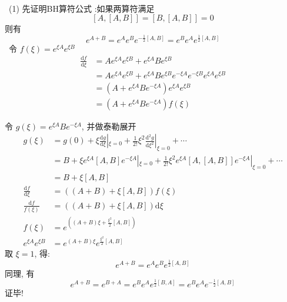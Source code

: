 \begin{frame}[allowframebreaks=] 
    \frametitle{}      
    ~\\
    \例 [3. 试证明平移符可写成 ]{ \[ D(\alpha)=\exp \left(\alpha a^{\dagger}-\alpha^{*} a\right) \]}
    \解 ~(1) 先证明BH算符公式 :如果两算符满足
        \[[A,[A,B]] = [B, [A,B]]=0\]
        则有 
        \[e^{A+B}= e^A e^B e^{-\frac{1}{2}[A,B]} =  e^B e^A e^{\frac{1}{2}[A,B]}\]  
    \证~令 $ f(\xi) = e^{\xi A} e^{\xi B}$ 
       \[ \begin{aligned}
           \frac{\mathrm{d}f}{\mathrm{d}\xi} &=Ae^{\xi A} e^{\xi B} + e^{\xi A} Be^{\xi B} \\
           &= Ae^{\xi A} e^{\xi B} + e^{\xi A} Be^{\xi B} e^{-\xi A} e^{-\xi B} e^{\xi A} e^{\xi B} \\
           &= (A+e^{\xi A} Be^{-\xi A})e^{\xi A} e^{\xi B} \\ 
           &= (A+e^{\xi A} Be^{-\xi A}) f(\xi)
       \end{aligned}\] 
             
       令 $g(\xi)= e^{\xi A} Be^{-\xi A}$, 并做泰勒展开
       \[\begin{aligned}
               g(\xi) &= g(0)+ \xi \frac{\mathrm{d}g}{\mathrm{d}\xi}|_{\xi=0}+ \frac{1}{2!}\xi^2 \frac{\mathrm{d}^2g}{\mathrm{d}\xi^2}|_{\xi=0}+ \cdots \\ 
               &= B + \xi e^{\xi A}[A,B]e^{-\xi A}|_{\xi=0} + \frac{1}{2!}\xi^2 e^{\xi A}[A,[A,B]]e^{-\xi A}|_{\xi=0} + \cdots \\ 
               &= B + \xi[A,B] \\ 
           \frac{\mathrm{d}f}{\mathrm{d}\xi} &= ((A+ B) + \xi[A,B] )f(\xi) \\ 
           \frac{\mathrm{d}f}{f(\xi)} &= ((A+ B) + \xi[A,B] ) \mathrm{d}\xi\\ 
           f(\xi) &=  e^{((A+ B)\xi + \frac{\xi^2}{2} [A,B] )}\\ 
           e^{\xi A} e^{\xi B} &= e^{(A+ B)\xi} e^{\frac{\xi^2}{2} [A,B]}
           \end{aligned} \]
           取 $\xi=1$, 得:
           \[e^{A+B}= e^A e^B e^{\frac{1}{2}[A,B]}\] 
           同理, 有 
           \[e^{A+B} = e^{B+A} = e^B e^A e^{\frac{1}{2}[B,A]} =e^B e^A e^{-\frac{1}{2}[A,B]} \] 
           证毕! \\ 
    \end{frame}
    
